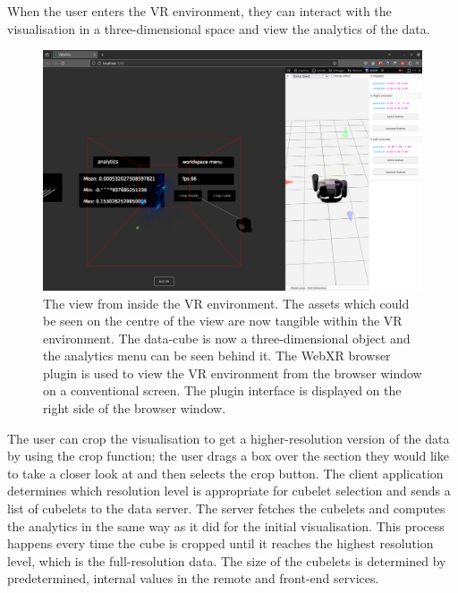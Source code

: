When the user enters the VR environment, they can interact with the visualisation in a three-dimensional space and view the analytics of the data. 
\begin{figure}
    \centering
    \includegraphics[width=\linewidth]{figures/screenshots/9.png}
    \caption{The view from inside the VR environment. The assets which could be seen on the centre of the view are now tangible within the VR environment. The data-cube is now a three-dimensional object and the analytics menu can be seen behind it. The WebXR browser plugin is used to view the VR environment from the browser window on a conventional screen. The plugin interface is displayed on the right side of the browser window.}
    \label{fig:screenshot-9}
\end{figure}
The user can crop the visualisation to get a higher-resolution version of the data by using the crop function; the user drags a box over the section they would like to take a closer look at and then selects the crop button. 
The client application determines which resolution level is appropriate for cubelet selection and sends a list of cubelets to the data server. 
The server fetches the cubelets and computes the analytics in the same way as it did for the initial visualisation. 
This process happens every time the cube is cropped until it reaches the highest resolution level, which is the full-resolution data. 
The size of the cubelets is determined by predetermined, internal values in the remote and front-end services.

